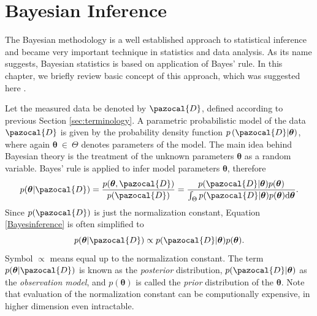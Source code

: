 \section{Bayesian Inference}
The Bayesian methodology is a well established approach to statistical inference and became very important technique in statistics and data analysis. As its name suggests, Bayesian statistics is based on application of Bayes' rule. In this chapter, we briefly review basic concept of this approach, which was suggested here \cite{smidl}. 

 Let the measured data be denoted by $\pazocal{D}$, defined according to previous Section \ref{sec:terminology}. A parametric probabilistic model of the data $\pazocal{D}$ is given by the probability density function  $p\left(\pazocal{D}|\boldsymbol{\theta}\right)$, where again $\boldsymbol{\theta}~\in~\Theta$ denotes parameters of the model. The main idea behind Bayesian theory is the treatment of the unknown parameters $\boldsymbol{\theta}$ as a random variable.  Bayes' rule is applied to infer model parameters $\boldsymbol{\theta}$, therefore
 \begin{equation}\label{Bayesinference}
 	p(\boldsymbol{\theta} | \pazocal{D}) = \frac{p(\boldsymbol{\theta}, \pazocal{D})}{p(\pazocal{D})} = \frac{p(\pazocal{D}| \boldsymbol{\theta})p(\boldsymbol{\theta})}{\int_{\Theta}p(\pazocal{D}|\boldsymbol{\theta})p(\boldsymbol{\theta})\d\boldsymbol{\theta}}.
 \end{equation} 
Since $p(\pazocal{D})$ is just the normalization constant, Equation \eqref{Bayesinference} is often simplified to
\begin{equation}
	p(\boldsymbol{\theta} | \pazocal{D}) \propto p(\pazocal{D}| \boldsymbol{\theta})p(\boldsymbol{\theta}).
\end{equation} 
Symbol $\propto$ means equal up to the normalization constant. The term $p(\boldsymbol{\theta} | \pazocal{D})$ is known as the \emph{posterior} distribution, $p(\pazocal{D}| \boldsymbol{\theta})$  as the \emph{observation model}, and $p(\boldsymbol{\theta})$ is called the \emph{prior} distribution of the $\boldsymbol{\theta}$. Note that evaluation of the normalization constant can be computionally expensive, in higher dimension even intractable. 

